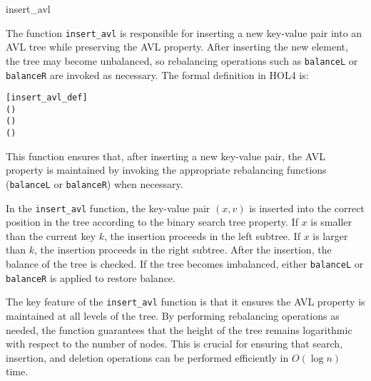 \begin{defn}{insert\_avl}

The function \texttt{insert\_avl} is responsible for inserting a new key-value pair into an AVL tree while preserving the AVL property. After inserting the new element, the tree may become unbalanced, so rebalancing operations such as \texttt{balanceL} or \texttt{balanceR} are invoked as necessary. The formal definition in HOL4 is:

\begin{alltt}
	[insert_avl_def]
	    \HOLTokenDefEquality{}   
   (     ) \HOLTokenDefEquality{}
    \HOLSymConst{=}        
     \HOLSymConst{\HOLTokenLt{}}      (   ) 
       (   )
\end{alltt}


This function ensures that, after inserting a new key-value pair, the AVL property is maintained by invoking the appropriate rebalancing functions (\texttt{balanceL} or \texttt{balanceR}) when necessary.
\end{defn}

In the \texttt{insert\_avl} function, the key-value pair \( (x, v) \) is inserted into the correct position in the tree according to the binary search tree property. If \( x \) is smaller than the current key \( k \), the insertion proceeds in the left subtree. If \( x \) is larger than \( k \), the insertion proceeds in the right subtree. After the insertion, the balance of the tree is checked. If the tree becomes imbalanced, either \texttt{balanceL} or \texttt{balanceR} is applied to restore balance.

The key feature of the \texttt{insert\_avl} function is that it ensures the AVL property is maintained at all levels of the tree. By performing rebalancing operations as needed, the function guarantees that the height of the tree remains logarithmic with respect to the number of nodes. This is crucial for ensuring that search, insertion, and deletion operations can be performed efficiently in \( O(\log n) \) time.

